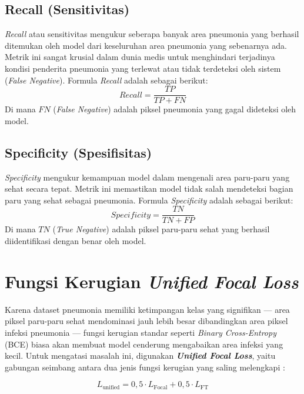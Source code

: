 \documentclass[12pt,a4paper,oneside]{book}
\begin{document}
\subsection{Recall (Sensitivitas)}

\textit{Recall} atau sensitivitas mengukur seberapa banyak area pneumonia yang berhasil ditemukan oleh model dari keseluruhan area pneumonia yang sebenarnya ada. Metrik ini sangat krusial dalam dunia medis untuk menghindari terjadinya kondisi penderita pneumonia yang terlewat atau tidak terdeteksi oleh sistem (\textit{False Negative}). Formula \textit{Recall} adalah sebagai berikut:
\begin{equation}
    Recall = \frac{TP}{TP + FN}
\end{equation}
Di mana $FN$ (\textit{False Negative}) adalah piksel pneumonia yang gagal dideteksi oleh model.

\subsection{Specificity (Spesifisitas)}

\textit{Specificity} mengukur kemampuan model dalam mengenali area paru-paru yang sehat secara tepat. Metrik ini memastikan model tidak salah mendeteksi bagian paru yang sehat sebagai pneumonia. Formula \textit{Specificity} adalah sebagai berikut:
\begin{equation}
    Specificity = \frac{TN}{TN + FP}
\end{equation}
Di mana $TN$ (\textit{True Negative}) adalah piksel paru-paru sehat yang berhasil diidentifikasi dengan benar oleh model.

\section{Fungsi Kerugian \textit{Unified Focal Loss}}

Karena dataset pneumonia memiliki ketimpangan kelas yang signifikan --- area piksel paru-paru sehat mendominasi jauh lebih besar dibandingkan area piksel infeksi pneumonia --- fungsi kerugian standar seperti \textit{Binary Cross-Entropy} (BCE) biasa akan membuat model cenderung mengabaikan area infeksi yang kecil. Untuk mengatasi masalah ini, digunakan \textbf{\textit{Unified Focal Loss}}, yaitu gabungan seimbang antara dua jenis fungsi kerugian yang saling melengkapi \parencite{yeung2022unifiedfocal}:

\begin{equation}
  L_{\text{unified}} = 0{,}5 \cdot L_{\text{Focal}} + 0{,}5 \cdot L_{\text{FT}}
\end{equation}
\end{document}
